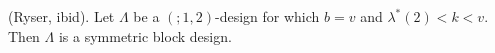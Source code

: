 (Ryser, ibid). Let $\Lambda$ be a $(; 1, 2)$-design for which $b = v$ and $\lambda^*(2) < k < v$. Then $\Lambda$ is a symmetric block design.
